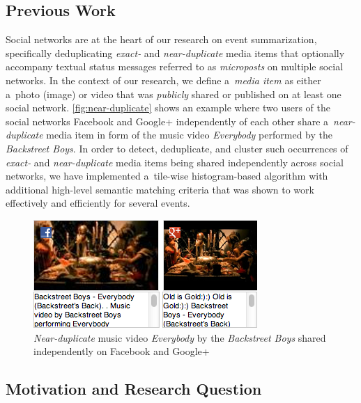 \documentclass{article}
\begin{document}
\subsection{Previous Work}
\label{sec:previous-work}

Social networks are at the heart of our research on event summarization,
specifically deduplicating \emph{exact-} and \emph{near-duplicate}
media items that optionally accompany textual status messages
referred to as \emph{microposts} on multiple social networks. 
In the context of our research, we define a~\emph{media item}
as either a~photo (image) or video
that was \emph{publicly} shared or published
on at least one social network.
\autoref{fig:near-duplicate} shows an example
where two users of the social networks Facebook and Google+
independently of each other share a~\emph{near-duplicate} media item
in form of the music video \emph{Everybody}
performed by the \emph{Backstreet Boys}.
In order to detect, deduplicate, and cluster such occurrences
of \emph{exact-} and \emph{near-duplicate}
media items being shared independently across social networks,
we have implemented a~tile-wise histogram-based algorithm
with additional high-level semantic matching criteria
that was shown to work effectively and efficiently for several events.

\begin{figure}[b!]
  \centering
  \includegraphics[width=0.9\linewidth]{./backstreetboys.png}
  \caption{\emph{Near-duplicate} music video \emph{Everybody}
    by the \emph{Backstreet Boys} shared
    independently on Facebook and Google+}
  \label{fig:near-duplicate}
\end{figure}

\subsection{Motivation and Research Question}
\label{sec:motivation-and-research-question}
\end{document}
